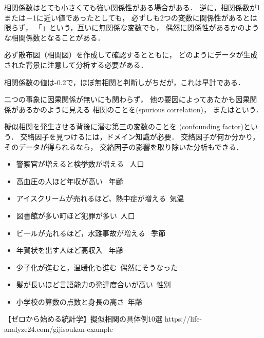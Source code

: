 {
  相関係数はとても小さくても強い関係性がある場合がある．
  逆に，相関係数が1または－1に近い値であったとしても，
  必ずしも2つの変数に関係性があるとは限らず，
  「」という，互いに無関係な変数でも，
  偶然に関係性があるかのような相関係数となることがある．

  \MyItems
  {
    \item 必ず散布図（相関図）を作成して確認するとともに，
    どのようにデータが生成された背景に注意して分析する必要がある．
  }
}

{
  相関係数の値は-0.2で，ほぼ無相関と判断しがちだが，これは早計である．
}

\MyFrame{}
{
}

\MyFrame{}
{
}

{
  {
    二つの事象に因果関係が無いにも関わらず，
    他の要因によってあたかも因果関係があるかのように見える
    相関のことを(spurious correlation)，
    またはという．
  }

  {
    擬似相関を発生させる背後に潜む第三の変数のことを
    (confounding factor)という．
  }
  交絡因子を見つけるには，ドメイン知識が必要．
  交絡因子が何か分かり，そのデータが得られるなら，
  交絡因子の影響を取り除いた分析もできる．
}

{
  \begin{itemize}%
    \item 警察官が増えると検挙数が増える \pause \ra~人口
    \pause
    \item 高血圧の人ほど年収が高い \pause \ra~年齢
    \pause
    \item アイスクリームが売れるほど、熱中症が増える\pause \ra~気温
    \pause
    \item 図書館が多い町ほど犯罪が多い\pause \ra~人口
    \pause
    \item ビールが売れるほど，水難事故が増える \pause \ra~季節
    \pause
    \item 年賀状を出す人ほど高収入 \pause \ra~年齢
    \pause
    \item 少子化が進むと，温暖化も進む\pause \ra~偶然にそうなった
    \pause
    \item 髪が長いほど言語能力の発達度合いが高い\pause \ra~性別
    \pause
    \item 小学校の算数の点数と身長の高さ\pause \ra~年齢
  \end{itemize}
  \vfill
  \MyRef
  {【ゼロから始める統計学】擬似相関の具体例10選}
  {https://life-analyze24.com/gijisoukan-example}
}


